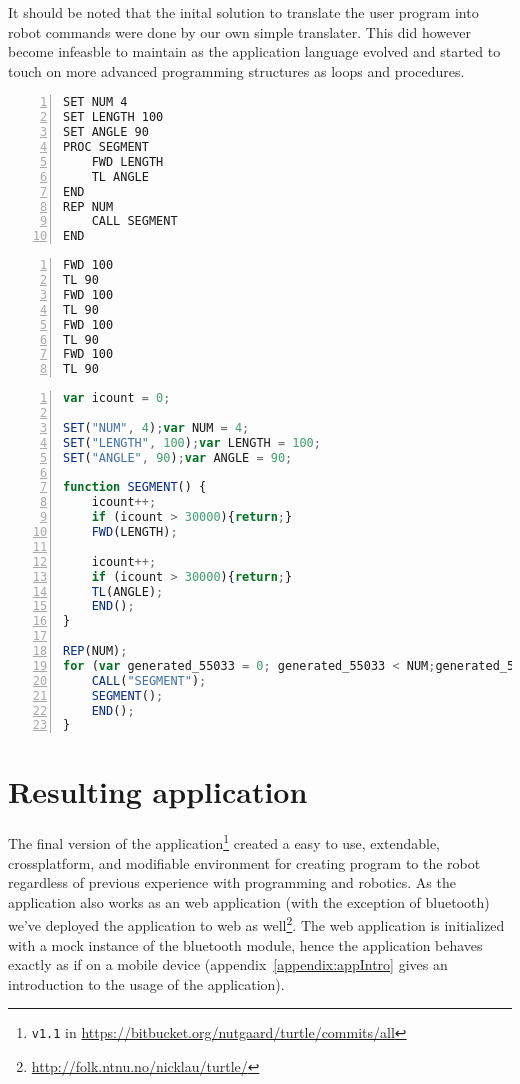 \bigskip\noindent
It should be noted that the inital solution to translate the user program into robot commands were done by our own simple translater. This did however become infeasble to maintain as the application language evolved and started to touch on more advanced programming structures as loops and procedures.  

\begin{minipage}{\linewidth}
	\begin{lstlisting}[frame=single,numbers=left,caption={Example code for creating a square using variables, procedures and loop.},language=MyBasic,label=lst:loop]
SET NUM 4
SET LENGTH 100
SET ANGLE 90
PROC SEGMENT
    FWD LENGTH
    TL ANGLE
END 
REP NUM
    CALL SEGMENT
END 
	\end{lstlisting}
	\begin{lstlisting}[frame=single,numbers=left,caption={Commands sent to simulator},language=MyBasic,label=lst:commands]
FWD 100
TL 90
FWD 100
TL 90
FWD 100
TL 90
FWD 100
TL 90
	\end{lstlisting}
\end{minipage}
\begin{minipage}{\linewidth}
	\begin{lstlisting}[frame=single,numbers=left,caption={The internal representation of the previous program.},language=Javascript,label=lst:internal]
var icount = 0; 

SET("NUM", 4);var NUM = 4; 
SET("LENGTH", 100);var LENGTH = 100; 
SET("ANGLE", 90);var ANGLE = 90; 

function SEGMENT() { 
	icount++; 
	if (icount > 30000){return;} 
	FWD(LENGTH); 

	icount++; 
	if (icount > 30000){return;} 
	TL(ANGLE); 
	END();
} 

REP(NUM);
for (var generated_55033 = 0; generated_55033 < NUM;generated_55033++) { 
	CALL("SEGMENT");
	SEGMENT(); 
	END();
}
	\end{lstlisting}
\end{minipage}

\section{Resulting application}
The final version of the application\footnote{\texttt{v1.1} in \url{https://bitbucket.org/nutgaard/turtle/commits/all}} created a easy to use, extendable, crossplatform, and modifiable environment for creating program to the robot regardless of previous experience with programming and robotics. As the application also works as an web application (with the exception of bluetooth) we've deployed the application to web as well\footnote{\url{http://folk.ntnu.no/nicklau/turtle/}}. The web application is initialized with a mock instance of the bluetooth module, hence the application behaves exactly as if on a mobile device (appendix~\ref{appendix:appIntro} gives an introduction to the usage of the application). 

